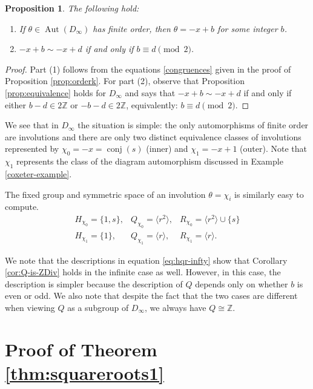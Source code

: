 \documentclass[12pt]{amsart}
\numberwithin{equation}{section}
\newtheorem{prop}[theorem]{Proposition}
\theoremstyle{definition}
\newcommand{\Aut}{\operatorname{Aut}}
\newcommand{\Z}{\mathbb{Z}}
\newcommand{\autconj}{\operatorname{conj}}
\renewcommand{\Z}{\mathbb{Z}}
\begin{document}
\begin{prop}
\label{prop:D-infnity-invol}
The following hold:
\begin{enumerate}
\item If $\theta \in \Aut(D_\infty)$ has finite order, 
then $\theta = -x + b$ for some integer $b$.
\item $-x + b \sim -x + d$ if and only if $b \equiv d \pmod{2}$.
\end{enumerate}
\end{prop}

\begin{proof}
Part (1) follows from the equations \eqref{congruences} given in the proof of Proposition
\ref{prop:orderk}. For part (2), observe that Proposition
\ref{prop:equivalence} holds for $D_\infty$ and says that 
$-x + b \sim -x + d$ if and only if either $b - d \in 2\Z$ or $-b-d
\in 2\Z$, equivalently: $b \equiv d \pmod{2}$. 
\end{proof}

We see that in $D_\infty$ the situation is simple: the only automorphisms
of finite order are involutions and there are only two distinct
equivalence classes of involutions represented by $\chi_0 = -x = \autconj(s)$
(inner) and $\chi_1 = -x+1$ (outer). Note that $\chi_1$ represents the class of the diagram automorphism discussed in Example \ref{coxeter-example}.

The fixed group and symmetric space of an involution $\theta = \chi_i$ is
similarly easy to compute.
\begin{equation}
\label{eq:hqr-infty}
\begin{array}{lll}
H_{\chi_0} = \{1, s\},& Q_{\chi_0} = \langle r^2 \rangle,& R_{\chi_0} =
\langle r^2 \rangle \cup \{ s \} \\
H_{\chi_1} = \{ 1 \}, & Q_{\chi_1} = \langle r \rangle,& R_{\chi_1} =
\langle r \rangle.
\end{array}
\end{equation}

We note that the descriptions in equation \eqref{eq:hqr-infty} show that Corollary \ref{cor:Q-is-ZDiv} holds in the infinite case as well. However, in this case, the description is simpler because the description of $Q$ depends only on whether $b$ is even or odd. We also note that despite the fact that the two cases are different when viewing $Q$ as a subgroup of $D_\infty$, we always have $Q\cong \Z$.

\appendix
\section{Proof of Theorem \ref{thm:squareroots1}}
\label{sec:appendix}
\end{document}
